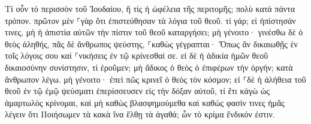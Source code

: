 \documentclass{openreader}
\begin{document}
Τί οὖν τὸ περισσὸν τοῦ Ἰουδαίου, ἢ τίς ἡ ὠφέλεια τῆς περιτομῆς; 
πολὺ κατὰ πάντα τρόπον. πρῶτον μὲν ⸀γὰρ ὅτι ἐπιστεύθησαν τὰ λόγια τοῦ θεοῦ. 
τί γάρ; εἰ ἠπίστησάν τινες, μὴ ἡ ἀπιστία αὐτῶν τὴν πίστιν τοῦ θεοῦ καταργήσει; 
μὴ γένοιτο· γινέσθω δὲ ὁ θεὸς ἀληθής, πᾶς δὲ ἄνθρωπος ψεύστης, ⸀καθὼς γέγραπται· Ὅπως ἂν δικαιωθῇς ἐν τοῖς λόγοις σου καὶ ⸀νικήσεις ἐν τῷ κρίνεσθαί σε. 
εἰ δὲ ἡ ἀδικία ἡμῶν θεοῦ δικαιοσύνην συνίστησιν, τί ἐροῦμεν; μὴ ἄδικος ὁ θεὸς ὁ ἐπιφέρων τὴν ὀργήν; κατὰ ἄνθρωπον λέγω. 
μὴ γένοιτο· ἐπεὶ πῶς κρινεῖ ὁ θεὸς τὸν κόσμον; 
εἰ ⸀δὲ ἡ ἀλήθεια τοῦ θεοῦ ἐν τῷ ἐμῷ ψεύσματι ἐπερίσσευσεν εἰς τὴν δόξαν αὐτοῦ, τί ἔτι κἀγὼ ὡς ἁμαρτωλὸς κρίνομαι, 
καὶ μὴ καθὼς βλασφημούμεθα καὶ καθώς φασίν τινες ἡμᾶς λέγειν ὅτι Ποιήσωμεν τὰ κακὰ ἵνα ἔλθῃ τὰ ἀγαθά; ὧν τὸ κρίμα ἔνδικόν ἐστιν. 
\end{document}
